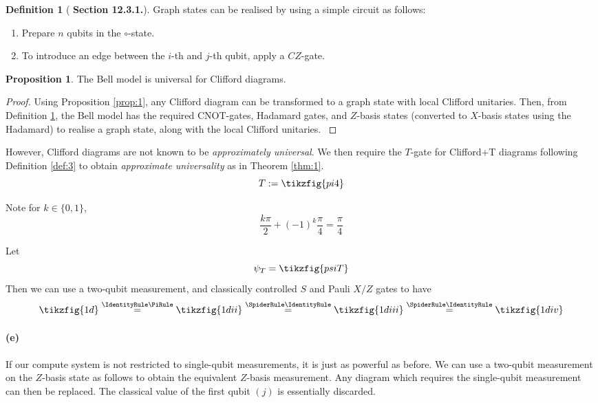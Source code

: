 \documentclass[11pt]{article} %
\theoremstyle{definition}
\newtheorem{proposition}[theorem]{Proposition}
\newtheorem{definition}[theorem]{Definition}
\begin{document}
\begin{definition}[{\cite{coecke2017picturing} \textbf{Section 12.3.1.}}]
Graph states can be realised by using a simple circuit as follows:
\begin{enumerate}
    \item Prepare $n$ qubits in the $\circ$-state.
    \item To introduce an edge between the $i$-th and $j$-th qubit, apply a $CZ$-gate.
\end{enumerate}
\label{def:5}
\end{definition}

\begin{proposition}
The Bell model is universal for Clifford diagrams.
\end{proposition}
\begin{proof}
Using Proposition \ref{prop:1}, any Clifford diagram 
can be transformed to a graph state with local Clifford unitaries.
Then, from Definition \ref{def:5}, the Bell model has the required CNOT-gates, Hadamard gates, 
and $Z$-basis states (converted to $X$-basis states using the Hadamard) to realise a graph state,
along with the local Clifford unitaries.
\label{prop:2}
\end{proof}

However, Clifford diagrams are not known to be \textit{approximately universal}.
We then require the $T$-gate for Clifford+T diagrams following Definition \ref{def:3} to obtain 
\textit{approximate universality} as in Theorem \ref{thm:1}.
\[T:=\tikzfig{pi4}\]

Note for $k\in\{0,1\}$, 
\[\frac{k\pi}{2} + (-1)^k \frac{\pi}{4} = \frac{\pi}{4}\]

Let
\[\psi_T= \tikzfig{psiT}\]
Then we can use a two-qubit measurement, and classically controlled $S$ and Pauli $X/Z$ gates to have
\[\tikzfig{1d}\stackrel{\IdentityRule\PiRule}{=}\tikzfig{1dii}
\stackrel{\SpiderRule\IdentityRule}{=}\tikzfig{1diii}\stackrel{\SpiderRule\IdentityRule}{=}\tikzfig{1div}\]

\paragraph{(e)}

If our compute system is not restricted to single-qubit measurements, it is just as powerful as before.
We can use a two-qubit measurement on the $Z$-basis state 
as follows to obtain the equivalent $Z$-basis measurement.
Any diagram which requires the single-qubit measurement can then be replaced.
The classical value of the first qubit $(j)$ is essentially discarded.
\end{document}
